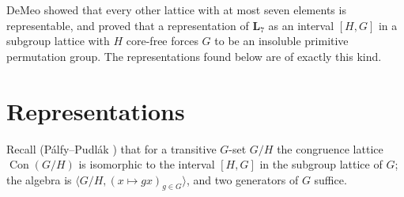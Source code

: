 \documentclass[11pt]{article}
\theoremstyle{remark}
\newcommand{\Con}{\operatorname{Con}}
\newcommand{\LL}{\mathbf{L}_7}
\begin{document}
\begin{center}
\end{center}

DeMeo \cite[Ch.~6]{DeMeo2012} showed that every other lattice with at most seven elements is
representable, and proved \cite[Thm.~4.1]{DeMeoIEP} that a representation of $\LL$ as an
interval $[H,G]$ in a subgroup lattice with $H$ core-free forces $G$ to be an
insoluble primitive permutation group. The representations found below are of exactly this kind.

\section{Representations}\label{sec:rep}

Recall (P\'alfy--Pudl\'ak \cite{PP}) that for a transitive $G$-set $G/H$ the congruence lattice
$\Con(G/H)$ is isomorphic to the interval $[H,G]$ in the subgroup lattice of $G$; the algebra
is $\langle G/H, (x\mapsto gx)_{g\in G}\rangle$, and two generators of $G$ suffice.
\end{document}
